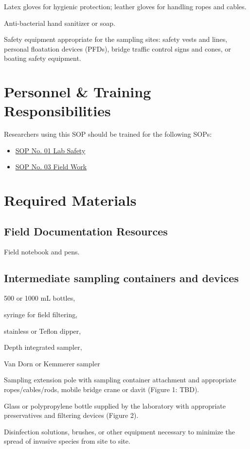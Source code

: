 \documentclass[12pt]{../SOP4_alpha}\usepackage[]{graphicx}\usepackage[]{xcolor}
\begin{document}
\NP Latex gloves for hygienic protection; leather gloves for handling ropes and cables.  


\NP Anti-bacterial hand sanitizer or soap.

\NP Safety equipment appropriate for the sampling sites: safety vests and lines, personal floatation devices (PFDs), bridge traffic control signs and cones, or boating safety equipment.  

\section{Personnel \& Training Responsibilities}

Researchers using this SOP should be trained for the following SOPs:

\begin{itemize}
  \item \href{https://github.com/marclos/SOPs/blob/master/01_Laboratory_Safety/Laboratory_Safety_v1.04.pdf}{SOP No. 01 Lab Safety}
  \item \href{https://github.com/marclos/SOPs/blob/master/03_Field_Safety/Field_Safety_v1.1.pdf}{SOP No. 03 Field Work}
\end{itemize}

\section{Required Materials}

\subsection{Field Documentation Resources}

\NP Field notebook and pens.  

\subsection{Intermediate sampling containers and devices}

\begin{itemize*}

\item 500 or 1000 mL bottles, 
\item syringe for field filtering, 
\item stainless or Teflon dipper, 
\item Depth integrated sampler, 
\item Van Dorn or Kemmerer sampler
\item Sampling extension pole with sampling container attachment and appropriate ropes/cables/rods, mobile bridge crane or davit  (Figure 1: TBD).  

\item Glass or polypropylene bottle supplied by the laboratory with appropriate preservatives and filtering devices (Figure 2).  


\item Disinfection solutions, brushes, or other equipment necessary to minimize the spread of invasive species from site to site. %

\end{itemize*}
\end{document}
